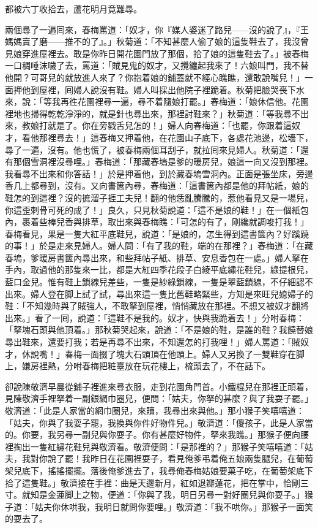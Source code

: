 \begin{myquote}
都被六丁收拾去，蘆花明月竟難尋。
\end{myquote}

兩個尋了一遍囘來，春梅罵道：「奴才，你『媒人婆迷了路兒——沒的說了』，『王媽媽賣了磨——推不的了』。」秋菊道：「不知甚麼人偷了娘的這隻鞋去了，我沒曾見娘穿進屋裡去。敢是你昨日開花園門放了那個，拾了娘的這隻鞋去了。」被春梅一口稠唾沫噦了去，罵道：「賊見鬼的奴才，又攪纏起我來了！六娘叫門，我不替他開？可哥兒的就放進人來了？你抱着娘的鋪蓋就不經心瞧瞧，還敢說嘴兒！」一面押他到屋裡，囘婦人說沒有鞋。婦人叫採出他院子裡跪着。秋菊把臉哭䘮下水來，說：「等我再徃花園裡尋一遍，尋不着隨娘打罷。」春梅道：「娘休信他。花園裡地也掃得乾乾淨淨的，就是針也尋出來，那裡討鞋來？」秋菊道：「等我尋不出來，教娘打就是了。你在旁戳舌兒怎的！」婦人向春梅道：「也罷，你跟着這奴才，看他那裡尋去！」這春梅又押着他，在花園山子底下，各處花池邊，松墻下，尋了一遍，沒有。他也慌了，被春梅兩個耳刮子，就拉囘來見婦人。秋菊道：「還有那個雪洞裡沒尋哩。」春梅道：「那藏春塢是爹的暖房兒，娘這一向又沒到那裡。我看尋不出來和你答話！」於是押着他，到於藏春塢雪洞內。正面是張坐床，旁邊香几上都尋到，沒有。又向書篋內尋，春梅道：「這書篋內都是他的拜帖紙，娘的鞋怎的到這裡？沒的摭溜子捱工夫兒！{}翻的他恁亂騰騰的，惹他看見又是一場兒，你這歪刺骨可死的成了！」良久，只見秋菊說道：「這不是娘的鞋！」{}在一個紙包內，裹着些棒兒香與排草，取出來與春梅瞧：「可怎的有了，剛纔就調唆打我！」春梅看見，果是一隻大紅平底鞋兒，說道：「是娘的，怎生得到這書篋內？好蹊蹺的事！」於是走來見婦人。婦人問：「有了我的鞋，端的在那裡？」春梅道：「在藏春塢，爹暖房書篋內尋出來，和些拜帖子紙、排草、安息香包在一處。」婦人拏在手內，取過他的那隻來一比，都是大紅四季花段子白綾平底繡花鞋兒，綠提根兒，藍口金兒。惟有鞋上鎖線兒差些，一隻是紗綠鎖線，一隻是翠藍鎖線，不仔細認不出來。婦人登在脚上試了試，尋出來這一隻比舊鞋略緊些，方知是來旺兒媳婦子的鞋：「不知幾時與了賊強人，不敢拏到屋裡，悄悄藏放在那裡。不想又被奴才翻將出來。」看了一囘，說道：「這鞋不是我的。奴才，快與我跪着去！」分咐春梅：「拏塊石頭與他頂着。」那秋菊哭起來，說道：「不是娘的鞋，是誰的鞋？我饒替娘尋出鞋來，還要打我；若是再尋不出來，不知還怎的打我哩！」婦人罵道：「賊奴才，休說嘴！」春梅一面掇了塊大石頭頂在他頭上。婦人又另換了一雙鞋穿在脚上，嫌房裡熱，分咐春梅把粧臺放在玩花樓上，梳頭去了，不在話下。

卻說陳敬濟早晨從鋪子裡進來尋衣服，走到花園角門首。小鐵棍兒在那裡正頑着，見陳敬濟手裡拏着一副銀網巾圈兒，便問：「姑夫，你拏的甚麼？與了我耍子罷。」敬濟道：「此是人家當的網巾圈兒，來贖，我尋出來與他。」那小猴子笑嘻嘻道：「姑夫，你與了我耍子罷，我換與你件好物件兒。」敬濟道：「傻孩子，此是人家當的。你要，我另尋一副兒與你耍子。你有甚麼好物件，拏來我瞧。」那猴子便向腰裡掏出一隻紅繡花鞋兒與敬濟看。敬濟便問：「是那裡的？」那猴子笑嘻嘻道：「姑夫，我對你說了罷！我昨日在花園裡耍子，看見俺爹弔着俺五娘兩隻腿兒，在葡萄架兒底下，搖搖擺擺。{}落後俺爹進去了，我尋俺春梅姑娘要菓子吃，在葡萄架底下拾了這隻鞋。」敬濟接在手裡：曲是天邊新月，紅如退瓣蓮花，把在掌中，恰剛三寸。就知是金蓮脚上之物，便道：「你與了我，明日另尋一對好圈兒與你耍子。」猴子道：「姑夫你休哄我，我明日就問你要哩。」敬濟道：「我不哄你。」那猴子一面笑的耍去了。

